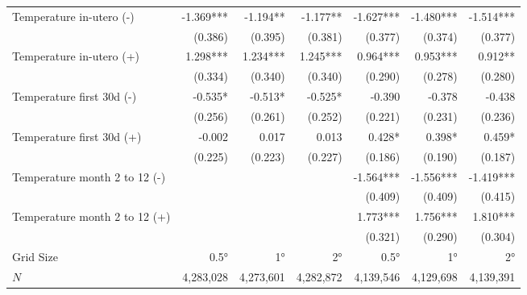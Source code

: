 \begin{tabular}{lrrrrrr}
Temperature in-utero   (-)                   &  -1.369***  &   -1.194**  &   -1.177**   &  -1.627***   &  -1.480***   & -1.514***    \\
                                                       &    (0.386)  &    (0.395)  &    (0.381)   &    (0.377)   &    (0.374)   &   (0.377)    \\
Temperature in-utero  (+)                    &   1.298***  &   1.234***  &   1.245***   &   0.964***   &   0.953***   &   0.912**    \\
                                                       &    (0.334)  &    (0.340)  &    (0.340)   &    (0.290)   &    (0.278)   &   (0.280)    \\
Temperature first 30d   (-)                  &    -0.535*  &    -0.513*  &    -0.525*   &     -0.390   &     -0.378   &    -0.438    \\
                                                       &    (0.256)  &    (0.261)  &    (0.252)   &    (0.221)   &    (0.231)   &   (0.236)    \\
Temperature first 30d (+)                    &     -0.002  &      0.017  &      0.013   &     0.428*   &     0.398*   &    0.459*    \\
                                                       &    (0.225)  &    (0.223)  &    (0.227)   &    (0.186)   &    (0.190)   &   (0.187)    \\
Temperature month 2 to 12 (-)                &             &             &              &  -1.564***   &  -1.556***   & -1.419***    \\ 
                                                       &             &             &              &    (0.409)   &    (0.409)   &   (0.415)    \\ 
Temperature month 2 to 12 (+)                &             &             &              &   1.773***   &   1.756***   &  1.810***    \\ 
                                            &             &             &              &    (0.321)   &    (0.290)   &   (0.304)    \\ 
\midrule
Grid Size                                   &       0.5°  &      1°     &      2°      &      0.5°    &     1°       &          2°  \\ 
$N$                                         &  4,283,028  &  4,273,601  &  4,282,872   &   4,139,546  &  4,129,698   &    4,139,391 \\ 
\bottomrule
\end{tabular}
